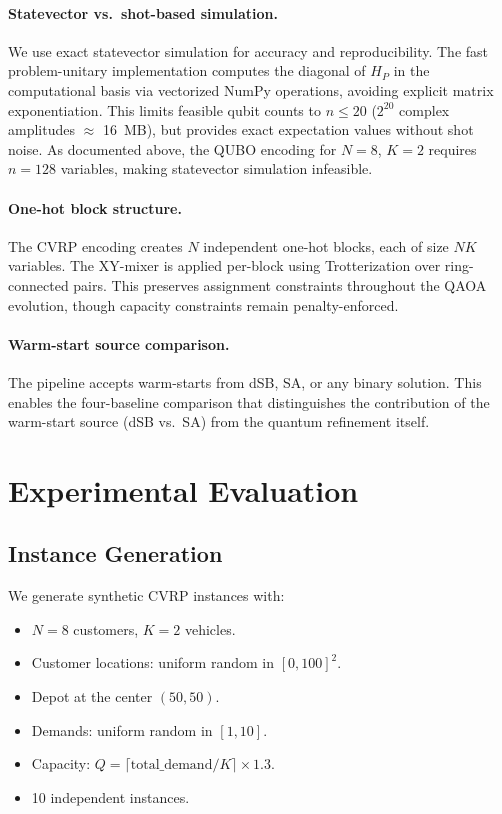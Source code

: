 \documentclass[11pt,a4paper]{article}
\theoremstyle{definition}
\begin{document}
\paragraph{Statevector vs.\ shot-based simulation.} We use exact statevector simulation for accuracy and reproducibility. The fast problem-unitary implementation computes the diagonal of $H_P$ in the computational basis via vectorized NumPy operations, avoiding explicit matrix exponentiation. This limits feasible qubit counts to $n \leq 20$ ($2^{20}$ complex amplitudes $\approx$ 16~MB), but provides exact expectation values without shot noise. As documented above, the QUBO encoding for $N=8$, $K=2$ requires $n=128$ variables, making statevector simulation infeasible.

\paragraph{One-hot block structure.} The CVRP encoding creates $N$ independent one-hot blocks, each of size $NK$ variables. The XY-mixer is applied per-block using Trotterization over ring-connected pairs. This preserves assignment constraints throughout the QAOA evolution, though capacity constraints remain penalty-enforced.

\paragraph{Warm-start source comparison.} The pipeline accepts warm-starts from dSB, SA, or any binary solution. This enables the four-baseline comparison that distinguishes the contribution of the warm-start source (dSB vs.\ SA) from the quantum refinement itself.

\section{Experimental Evaluation}\label{sec:experiments}

\subsection{Instance Generation}

We generate synthetic CVRP instances with:
\begin{itemize}
    \item $N = 8$ customers, $K = 2$ vehicles.
    \item Customer locations: uniform random in $[0, 100]^2$.
    \item Depot at the center $(50, 50)$.
    \item Demands: uniform random in $[1, 10]$.
    \item Capacity: $Q = \lceil \text{total\_demand} / K \rceil \times 1.3$.
    \item \num{10} independent instances.
\end{itemize}
\end{document}
